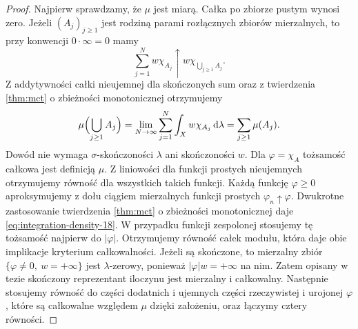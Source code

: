 \begin{proof}
Najpierw sprawdzamy, że $\mu$ jest miarą. Całka
po zbiorze pustym wynosi zero. Jeżeli $(A_j)_{j\ge1}$
jest rodziną parami rozłącznych zbiorów mierzalnych, to
przy konwencji $0\cdot\infty=0$ mamy
\[
 \sum_{j=1}^{N}w\chi_{A_j}
 \uparrow w\chi_{\bigcup_{j\ge1}A_j}.
\]
Z addytywności całki nieujemnej dla skończonych sum
oraz z twierdzenia \ref{thm:mct} o zbieżności
monotonicznej otrzymujemy
\[
 \mu\Bigl(\bigcup_{j\ge1}A_j\Bigr)
 =\lim_{N\to\infty}\sum_{j=1}^{N}
          \int_X w\chi_{A_j}\,\mathrm d\lambda
 =\sum_{j\ge1}\mu(A_j).
\]
Dowód nie wymaga $\sigma$-skończoności $\lambda$
ani skończoności $w$. Dla $\varphi=\chi_A$
tożsamość całkowa jest definicją $\mu$.
Z liniowości dla funkcji prostych nieujemnych otrzymujemy
równość dla wszystkich takich funkcji. Każdą funkcję
$\varphi\ge0$ aproksymujemy z dołu ciągiem mierzalnych
funkcji prostych $\varphi_n\uparrow\varphi$.
Dwukrotne zastosowanie twierdzenia \ref{thm:mct} o zbieżności monotonicznej
daje \eqref{eq:integration-density-18}. W przypadku
funkcji zespolonej stosujemy tę tożsamość najpierw do $|\varphi|$.
Otrzymujemy równość całek modułu, która daje obie
implikacje kryterium całkowalności. Jeżeli są skończone,
to mierzalny zbiór $\{\varphi\ne0,\ w=+\infty\}$ jest
$\lambda$-zerowy, ponieważ $|\varphi|w=+\infty$ na nim.
Zatem opisany w tezie skończony reprezentant iloczynu
jest mierzalny i całkowalny. Następnie stosujemy równość do części
dodatnich i ujemnych części rzeczywistej i urojonej $\varphi$,
które są całkowalne względem $\mu$ dzięki założeniu, oraz łączymy cztery równości.
\end{proof}

